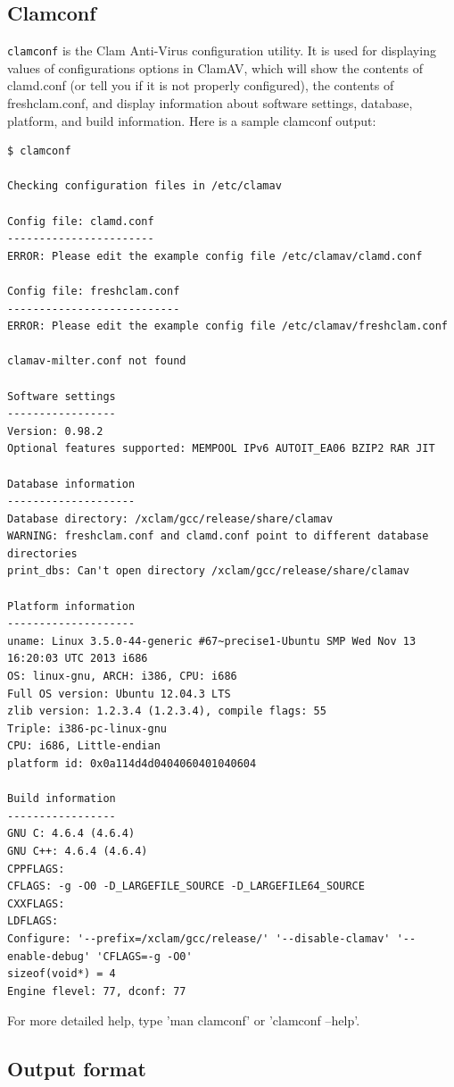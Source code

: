 \documentclass[a4paper,titlepage,12pt]{article}
\begin{document}
    \subsection{Clamconf}\label{sec:clamconf}
    \verb+clamconf+ is the Clam Anti-Virus configuration utility.  It is used
    for displaying values of configurations options in ClamAV, which
    will show the contents of clamd.conf (or tell you if it is not
    properly configured), the contents of freshclam.conf, and display
    information about software settings, database, platform, and build
    information. Here is a sample clamconf output:
{\footnotesize
    \begin{verbatim}
$ clamconf

Checking configuration files in /etc/clamav

Config file: clamd.conf
-----------------------
ERROR: Please edit the example config file /etc/clamav/clamd.conf

Config file: freshclam.conf
---------------------------
ERROR: Please edit the example config file /etc/clamav/freshclam.conf

clamav-milter.conf not found

Software settings
-----------------
Version: 0.98.2
Optional features supported: MEMPOOL IPv6 AUTOIT_EA06 BZIP2 RAR JIT

Database information
--------------------
Database directory: /xclam/gcc/release/share/clamav
WARNING: freshclam.conf and clamd.conf point to different database directories
print_dbs: Can't open directory /xclam/gcc/release/share/clamav

Platform information
--------------------
uname: Linux 3.5.0-44-generic #67~precise1-Ubuntu SMP Wed Nov 13 16:20:03 UTC 2013 i686
OS: linux-gnu, ARCH: i386, CPU: i686
Full OS version: Ubuntu 12.04.3 LTS
zlib version: 1.2.3.4 (1.2.3.4), compile flags: 55
Triple: i386-pc-linux-gnu
CPU: i686, Little-endian
platform id: 0x0a114d4d0404060401040604

Build information
-----------------
GNU C: 4.6.4 (4.6.4)
GNU C++: 4.6.4 (4.6.4)
CPPFLAGS:
CFLAGS: -g -O0 -D_LARGEFILE_SOURCE -D_LARGEFILE64_SOURCE
CXXFLAGS:
LDFLAGS:
Configure: '--prefix=/xclam/gcc/release/' '--disable-clamav' '--enable-debug' 'CFLAGS=-g -O0'
sizeof(void*) = 4
Engine flevel: 77, dconf: 77
 \end{verbatim}
}
    For more detailed help, type 'man clamconf' or 'clamconf --help'.

    \subsection{Output format}
\end{document}
